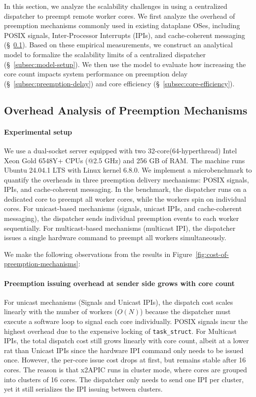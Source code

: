 In this section, we analyze the scalability challenges in using a centralized dispatcher to preempt remote worker cores.
We first analyze the overhead of preemption mechanisms commonly used in existing dataplane OSes, including POSIX signals, Inter-Processor Interrupts (IPIs), and cache-coherent messaging (\S~\ref{subsec:overhead-analysis}).
Based on these empirical measurements, we construct an analytical model to formalize the scalability limits of a centralized dispatcher (\S~\ref{subsec:model-setup}).
We then use the model to evaluate how increasing the core count impacts system performance on preemption delay (\S~\ref{subsec:preemption-delay}) and core efficiency (\S~\ref{subsec:core-efficiency}).

\subsection{Overhead Analysis of Preemption Mechanisms}
\label{subsec:overhead-analysis}

\paragraph{Experimental setup}
We use a dual-socket server equipped with two 32-core(64-hyperthread) Intel Xeon Gold 6548Y+ CPUs (@2.5 GHz) and 256 GB of RAM. 
The machine runs Ubuntu 24.04.1 LTS with Linux kernel 6.8.0.
We implement a microbenchmark to quantify the overheads in three preemption delivery mechanisms: POSIX signals, IPIs, and cache-coherent messaging.
In the benchmark, the dispatcher runs on a dedicated core to preempt all worker cores, while the workers spin on individual cores.
For unicast-based mechanisms (signals, unicast IPIs, and cache-coherent messaging), the dispatcher sends individual preemption events to each worker sequentially.
For multicast-based mechanisms (multicast IPI), the dispatcher issues a single hardware command to preempt all workers simultaneously.

We make the following observations from the results in Figure~\ref{fig:cost-of-preemption-mechanisms}:

\paragraph{Preemption issuing overhead at sender side grows with core count}
For unicast mechanisms (Signals and Unicast IPIs), the dispatch cost scales linearly with the number of workers ($O(N)$) because the dispatcher must execute a software loop to signal each core individually.
POSIX signals incur the highest overhead due to the expensive locking of \texttt{task\_struct}.
For Multicast IPIs, the total dispatch cost still grows linearly with core count, albeit at a lower rat than Unicast IPIs since the hardware IPI command only needs to be issued once.
However, the per-core issue cost drops at first, but remains stable after 16 cores.
The reason is that x2APIC runs in cluster mode, where cores are grouped into clusters of 16 cores.
The dispatcher only needs to send one IPI per cluster, yet it still serializes the IPI issuing between clusters.

